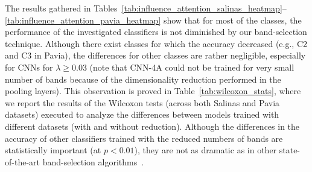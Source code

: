 \documentclass[journal]{IEEEtran}
\newcommand{\ContaminationRate}{\lambda}
\begin{document}
The results gathered in Tables~\ref{tab:influence_attention_salinas_heatmap}--\ref{tab:influence_attention_pavia_heatmap} show that for most of the classes, the performance of the investigated classifiers is not diminished by our band-selection technique. Although there exist classes for which the accuracy decreased (e.g., C2 and C3 in Pavia), the differences for other classes are rather negligible, especially for CNNs for $\ContaminationRate\geq0.03$ (note that CNN-4A could not be trained for very small number of bands because of the dimensionality reduction performed in the pooling layers). This observation is proved in Table~\ref{tab:wilcoxon_stats}, where we report the results of the Wilcoxon tests (across both Salinas and Pavia datasets) executed to analyze the differences between models trained with different datasets (with and without reduction). Although the differences in the accuracy of other classifiers trained with the reduced numbers of bands are statistically important (at $p<0.01$), they are not as dramatic as in other state-of-the-art band-selection algorithms~\cite{DBLP:journals/corr/abs-1802-06983}.
\end{document}
